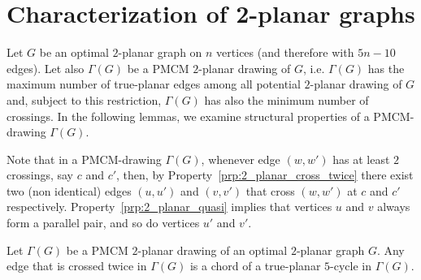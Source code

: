 \section{Characterization of 2-planar graphs}
\label{sec:2planar}

Let $G$ be an optimal $2$-planar graph on $n$ vertices (and therefore with $5n-10$ edges). Let also $\Gamma(G)$ be a PMCM $2$-planar drawing of $G$, i.e. $\Gamma(G)$ has the maximum number of true-planar edges among all potential $2$-planar drawing of $G$ and, subject to this restriction, $\Gamma(G)$ has also the minimum number of crossings. 
In the following lemmas, we examine structural properties of a PMCM-drawing $\Gamma(G)$.

Note that in a PMCM-drawing $\Gamma(G)$, whenever edge $(w,w')$ has at least $2$ 
crossings, say $c$ and $c'$, then, by 
Property~\ref{prp:2_planar_cross_twice}  there 
exist two (non identical) edges $(u,u')$ and $(v,v')$ that cross $(w,w')$ at $c$ 
and $c'$ respectively. Property~\ref{prp:2_planar_quasi} implies that 
vertices $u$ and $v$ always form a parallel pair, and so do vertices $u'$ and 
$v'$. 


\begin{lemma}
Let $\Gamma(G)$ be a PMCM $2$-planar drawing of an optimal $2$-planar graph $G$. Any edge that is crossed twice in  $\Gamma(G)$ is a chord of a true-planar $5$-cycle in $\Gamma(G)$. 
\label{lem:2_planar_small_faces}
\end{lemma}

